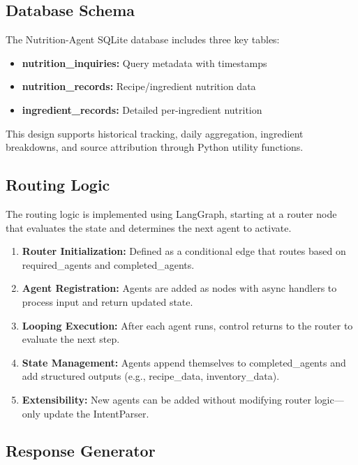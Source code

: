 \documentclass{ecai}
\begin{document}
\subsection{Database Schema}

The Nutrition-Agent SQLite database includes three key tables:
\begin{itemize}[noitemsep,topsep=0pt]
    \item \textbf{nutrition\_inquiries:} Query metadata with timestamps
    \item \textbf{nutrition\_records:} Recipe/ingredient nutrition data
    \item \textbf{ingredient\_records:} Detailed per-ingredient nutrition
\end{itemize}

This design supports historical tracking, daily aggregation, ingredient breakdowns, and source attribution through Python utility functions.

\subsection{Routing Logic}

The routing logic is implemented using LangGraph, starting at a router node that evaluates the state and determines the next agent to activate.
\begin{enumerate}[noitemsep,topsep=0pt]
    \item \textbf{Router Initialization:} Defined as a conditional edge that routes based on required\_agents and completed\_agents.
    \item \textbf{Agent Registration:} Agents are added as nodes with async handlers to process input and return updated state.
    \item \textbf{Looping Execution:} After each agent runs, control returns to the router to evaluate the next step.
    \item \textbf{State Management:} Agents append themselves to completed\_agents and add structured outputs (e.g., recipe\_data, inventory\_data).
    \item \textbf{Extensibility:} New agents can be added without modifying router logic—only update the IntentParser.
\end{enumerate}

\subsection{Response Generator}
\end{document}
